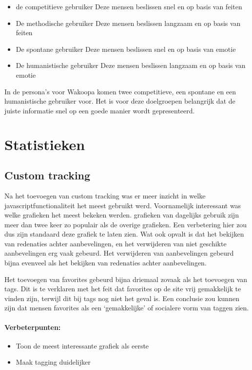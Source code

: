\documentclass[a4paper, 10pt, pdftex]{report}
\begin{document}
      \begin{itemize}
        \item de competitieve gebruiker
          Deze mensen beslissen snel en op basis van feiten
        \item De methodische gebruiker
          Deze mensen beslissen langzaam en op basis van feiten
        \item De spontane gebruiker
          Deze mensen beslissen snel en op basis van emotie
        \item De humanistische gebruiker
          Deze mensen beslissen langzaam en op basis van emotie
      \end{itemize}

      In de persona's voor Wakoopa komen twee competitieve, een spontane en een humanistische gebruiker voor. Het is voor deze doelgroepen belangrijk dat de juiste informatie snel op een goede manier wordt gepresenteerd.

    \section{Statistieken}
    \subsection{Custom tracking}
    Na het toevoegen van custom tracking was er meer inzicht in welke javascriptfunctionaliteit het meest gebruikt werd. Voornamelijk interessant was welke grafieken het meest bekeken werden. grafieken van dagelijks gebruik zijn meer dan twee keer zo populair als de overige grafieken. Een verbetering hier zou dus zijn standaard deze grafiek te laten zien. Wat ook opvalt is dat het bekijken van redenaties achter aanbevelingen, en het verwijderen van niet geschikte aanbevelingen erg vaak gebeurd. Het verwijderen van aanbevelingen gebeurd bijna evenveel als het bekijken van redenaties achter aanbevelingen.

    Het toevoegen van favorites gebeurd bijna driemaal zovaak als het toevoegen van tags. Dit is te verklaren met het feit dat favorites op de site vrij gemakkelijk te vinden zijn, terwijl dit bij tags nog niet het geval is. Een conclusie zou kunnen zijn dat mensen favorites als een `gemakkelijke' of socialere vorm van taggen zien.

    \paragraph{\textbf{Verbeterpunten:}}
      \begin{itemize}
        \item Toon de meest interessante grafiek als eerste
        \item Maak tagging duidelijker
      \end{itemize}
\end{document}
